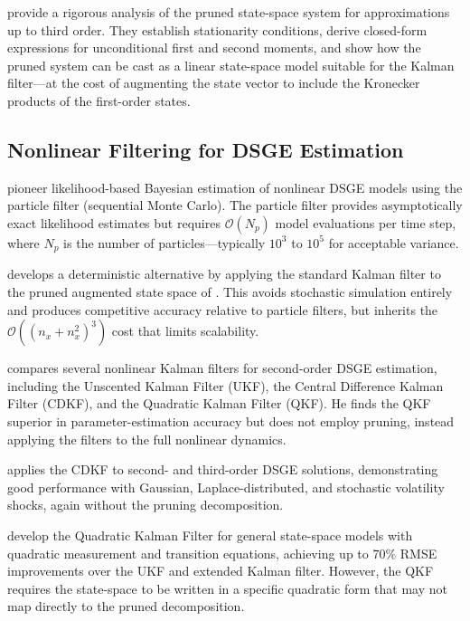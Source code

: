 \documentclass[12pt,a4paper]{article}
\newcommand{\cO}{\mathcal{O}}
\begin{document}
\citet{andreasen2018pruned} provide a rigorous analysis of the pruned
state-space system for approximations up to third order. They establish
stationarity conditions, derive closed-form expressions for
unconditional first and second moments, and show how the pruned system
can be cast as a linear state-space model suitable for the Kalman
filter---at the cost of augmenting the state vector to include the
Kronecker products of the first-order states.

\subsection{Nonlinear Filtering for DSGE Estimation}

\citet{fernandez2007estimating} pioneer likelihood-based Bayesian
estimation of nonlinear DSGE models using the particle filter
(sequential Monte Carlo). The particle filter provides asymptotically
exact likelihood estimates but requires $\cO(N_p)$ model evaluations
per time step, where $N_p$ is the number of particles---typically
$10^3$ to $10^5$ for acceptable variance.

\citet{kollmann2014tractable} develops a deterministic alternative
by applying the standard Kalman filter to the pruned augmented state
space of \citet{kim2008calculating}. This avoids stochastic simulation
entirely and produces competitive accuracy relative to particle
filters, but inherits the $\cO((n_x + n_x^2)^3)$ cost that limits
scalability.

\citet{ivashchenko2014dsge} compares several nonlinear Kalman filters
for second-order DSGE estimation, including the Unscented Kalman
Filter (UKF), the Central Difference Kalman Filter (CDKF), and the
Quadratic Kalman Filter (QKF). He finds the QKF superior in
parameter-estimation accuracy but does not employ pruning, instead
applying the filters to the full nonlinear dynamics.

\citet{andreasen2012non} applies the CDKF to second- and third-order
DSGE solutions, demonstrating good performance with Gaussian,
Laplace-distributed, and stochastic volatility shocks, again without
the pruning decomposition.

\citet{monfort2015quadratic} develop the Quadratic Kalman Filter for
general state-space models with quadratic measurement and transition
equations, achieving up to 70\% RMSE improvements over the UKF and
extended Kalman filter. However, the QKF requires the state-space to
be written in a specific quadratic form that may not map directly
to the pruned decomposition.
\end{document}
